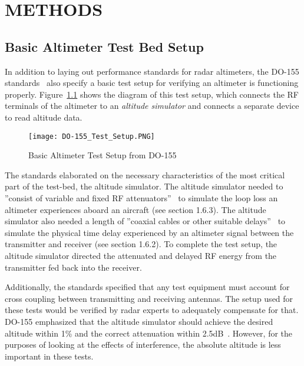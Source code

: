 %
%
%
%



\chapter{METHODS} 
\section{Basic Altimeter Test Bed Setup} \label{sec:Basic}
In addition to laying out performance standards for radar altimeters, the DO-155 standards~\cite{noauthor_minimum_1974} also specify a basic test setup for verifying an altimeter is functioning properly. Figure~\ref{fig:Basic Testbed} shows the diagram of this test setup, which connects the RF terminals of the altimeter to an \textit{altitude simulator} and connects a separate device to read altitude data.  
\begin{figure}[ht]
\centering
\texttt{[image: DO-155\_Test\_Setup.PNG]}
\caption{Basic Altimeter Test Setup from DO-155~\cite{noauthor_minimum_1974}}

\label{fig:Basic Testbed}

\end{figure}

The standards elaborated on the necessary characteristics of the most critical part of the test-bed, the altitude simulator. The altitude simulator needed to ''consist of variable and fixed RF attenuators''~\cite{noauthor_minimum_1974}  to simulate the loop loss an altimeter experiences aboard an aircraft (see section 1.6.3). The altitude simulator also needed a length of ''coaxial cables or other suitable delays''~\cite{noauthor_minimum_1974}  to simulate the physical time delay experienced by an altimeter signal between the transmitter and receiver (see section 1.6.2). To complete the test setup, the altitude simulator directed the attenuated and delayed RF energy from the transmitter fed back into the receiver. 


Additionally, the standards specified that any test equipment must account for cross coupling between transmitting and receiving antennas. The setup used for these tests would be verified by radar experts to adequately compensate for that. DO-155 emphasized that the altitude simulator should achieve the desired altitude within 1\% and the correct attenuation within 2.5dB~\cite{noauthor_minimum_1974}. However, for the purposes of looking at the effects of interference, the absolute altitude is less important in these tests. 

